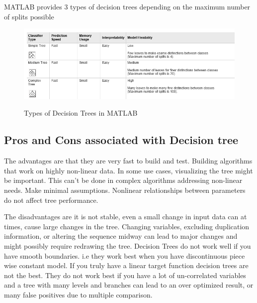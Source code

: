 \noindent MATLAB provides 3 types of decision trees depending on the maximum number of splits possible


\begin{figure}[H]
\centering
{\includegraphics[scale=0.75]{table.png}}
\caption{Types of Decision Trees in MATLAB}
\end{figure}


\subsection{Pros and Cons associated with Decision tree} \label{Pros and Cons associated with Decision tree}

The advantages are that they are very fast to build and test. Building algorithms that work on highly non-linear data. In some use cases, visualizing the tree might be important. This can't be done in complex algorithms addressing non-linear needs.
Make minimal assumptions. Nonlinear relationships between parameters do not affect tree performance.

The disadvantages are it is not stable, even a small change in input data can at times, cause large changes in the tree. Changing variables, excluding duplication information, or altering the sequence midway can lead to major changes and might possibly require redrawing the tree. Decision Trees do not work well if you have smooth boundaries.  i.e they work best when you have discontinuous piece wise constant model. If you truly have a linear target function decision trees are not the best. They do not work best if you have a lot of un-correlated variables and a tree with many levels and branches can lead to an over optimized result, or many false positives due to multiple comparison.
